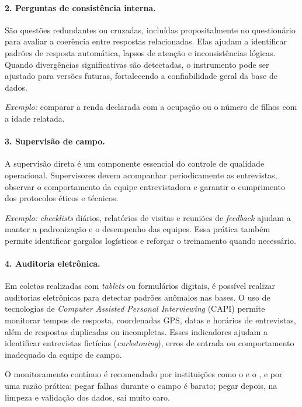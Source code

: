 \documentclass[12pt, a4paper, openany]{book}
\begin{document}
\paragraph{2. Perguntas de consist\^encia interna.} S\~ao quest\~oes redundantes ou cruzadas, inclu\'idas propositalmente no question\'ario para avaliar a coer\^encia entre respostas relacionadas. Elas ajudam a identificar padr\~oes de resposta autom\'atica, lapsos de aten\c{c}\~ao e inconsist\^encias l\'ogicas. Quando diverg\^encias significativas s\~ao detectadas, o instrumento pode ser ajustado para vers\~oes futuras, fortalecendo a confiabilidade geral da base de dados.

\textit{Exemplo:} comparar a renda declarada com a ocupa\c{c}\~ao ou o n\'umero de filhos com a idade relatada.

\paragraph{3. Supervis\~ao de campo.} A supervis\~ao direta \'e um componente essencial do controle de qualidade operacional. Supervisores devem acompanhar periodicamente as entrevistas, observar o comportamento da equipe entrevistadora e garantir o cumprimento dos protocolos \'eticos e t\'ecnicos.

\textit{Exemplo:} \textit{checklists} di\'arios, relat\'orios de visitas e reuni\~oes de \textit{feedback} ajudam a manter a padroniza\c{c}\~ao e o desempenho das equipes. Essa pr\'atica tamb\'em permite identificar gargalos log\'isticos e refor\c{c}ar o treinamento quando necess\'ario.

\paragraph{4. Auditoria eletr\^onica.} Em coletas realizadas com \textit{tablets} ou formul\'arios digitais, \'e poss\'ivel realizar auditorias eletr\^onicas para detectar padr\~oes an\^omalos nas bases. O uso de tecnologias de \textit{Computer Assisted Personal Interviewing} (CAPI) permite monitorar tempos de resposta, coordenadas GPS, datas e hor\'arios de entrevistas, al\'em de respostas duplicadas ou incompletas. Esses indicadores ajudam a identificar entrevistas fict\'icias (\textit{curbstoning}), erros de entrada ou comportamento inadequado da equipe de campo.

O monitoramento cont\'inuo \'e recomendado por institui\c{c}\~oes como o \citet{jpal2020practical} e o \citet{worldbank2021data}, e por uma raz\~ao pr\'atica: pegar falhas durante o campo \'e barato; pegar depois, na limpeza e valida\c{c}\~ao dos dados, sai muito caro.
\end{document}
